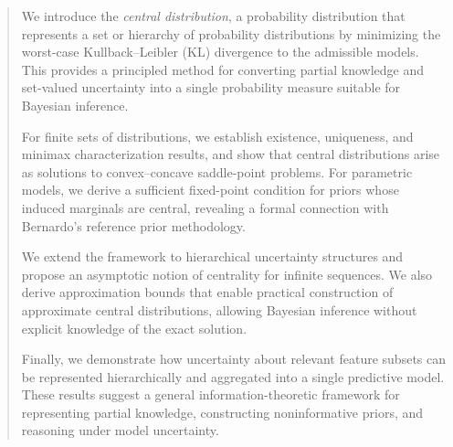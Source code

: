 \begin{abstract}
    We introduce the \emph{central distribution}, a probability distribution that represents a set or hierarchy of
    probability distributions by minimizing the worst-case Kullback--Leibler (KL)
    divergence to the admissible models.
    This provides a principled method for converting partial knowledge and set-valued uncertainty into a single
    probability measure suitable for Bayesian inference.

    For finite sets of distributions, we establish existence, uniqueness, and minimax characterization results, and
    show that central distributions arise as solutions to convex--concave saddle-point problems.
    For parametric models, we derive a sufficient fixed-point condition for priors whose induced marginals
    are central, revealing a formal connection with Bernardo's reference prior methodology.

    We extend the framework to hierarchical uncertainty structures and propose an asymptotic notion of centrality for
    infinite sequences.
    We also derive approximation bounds that enable practical construction of approximate central distributions,
    allowing Bayesian inference without explicit knowledge of the exact solution.

    Finally, we demonstrate how uncertainty about relevant feature subsets can be represented hierarchically and
    aggregated into a single predictive model.
    These results suggest a general information-theoretic framework for representing partial knowledge, constructing
    noninformative priors, and reasoning under model uncertainty.
\end{abstract}
